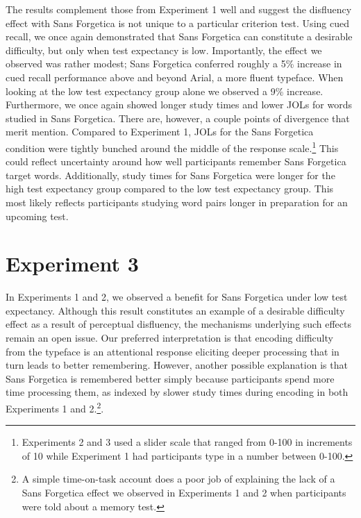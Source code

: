 \documentclass[
  english,
  jou]{apa7}
\begin{document}
The results complement those from Experiment 1 well and suggest the disfluency effect with Sans Forgetica is not unique to a particular criterion test. Using cued recall, we once again demonstrated that Sans Forgetica can constitute a desirable difficulty, but only when test expectancy is low. Importantly, the effect we observed was rather modest; Sans Forgetica conferred roughly a 5\% increase in cued recall performance above and beyond Arial, a more fluent typeface. When looking at the low test expectancy group alone we observed a 9\% increase. Furthermore, we once again showed longer study times and lower JOLs for words studied in Sans Forgetica. There are, however, a couple points of divergence that merit mention. Compared to Experiment 1, JOLs for the Sans Forgetica condition were tightly bunched around the middle of the response scale.\footnote{Experiments 2 and 3 used a slider scale that ranged from 0-100 in increments of 10 while Experiment 1 had participants type in a number between 0-100.} This could reflect uncertainty around how well participants remember Sans Forgetica target words. Additionally, study times for Sans Forgetica were longer for the high test expectancy group compared to the low test expectancy group. This most likely reflects participants studying word pairs longer in preparation for an upcoming test.

\hypertarget{experiment-3}{%
\section{Experiment 3}\label{experiment-3}}

In Experiments 1 and 2, we observed a benefit for Sans Forgetica under low test expectancy. Although this result constitutes an example of a desirable difficulty effect as a result of perceptual disfluency, the mechanisms underlying such effects remain an open issue. Our preferred interpretation is that encoding difficulty from the typeface is an attentional response eliciting deeper processing that in turn leads to better remembering. However, another possible explanation is that Sans Forgetica is remembered better simply because participants spend more time processing them, as indexed by slower study times during encoding in both Experiments 1 and 2.\footnote{A simple time-on-task account does a poor job of explaining the lack of a Sans Forgetica effect we observed in Experiments 1 and 2 when participants were told about a memory test.}.
\end{document}
